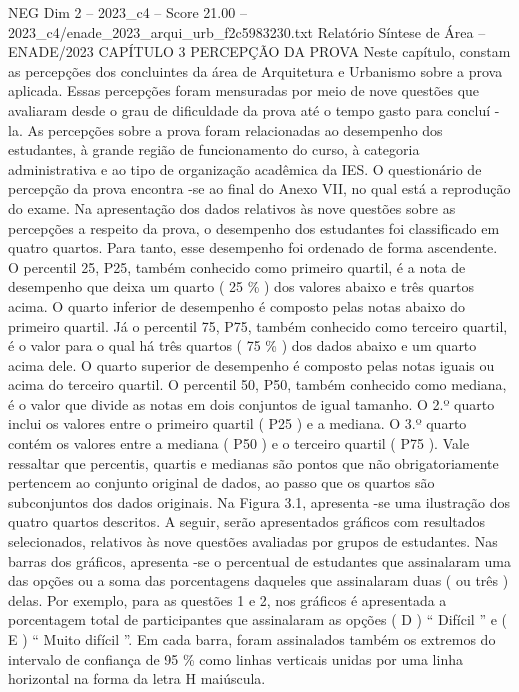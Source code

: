 \begin{textsample}{NEG Dim 2 – 2023\_c4 – Score 21.00 – 2023\_c4/enade\_2023\_arqui\_urb\_f2c5983230.txt}  \label{ex:f2_neg_416}
Relatório Síntese de Área – ENADE/2023 CAPÍTULO 3 PERCEPÇÃO DA PROVA Neste capítulo, constam as percepções dos concluintes da área de Arquitetura e Urbanismo sobre a prova aplicada.
Essas percepções foram mensuradas por meio de nove questões que avaliaram desde o grau de dificuldade da prova até o tempo gasto para concluí -la.
As percepções sobre a prova foram relacionadas ao desempenho dos estudantes, à grande região de funcionamento do curso, à categoria administrativa e ao tipo de organização acadêmica da IES.
O questionário de percepção da prova encontra -se ao final do Anexo VII, no qual está a reprodução do exame.
Na apresentação dos dados relativos às nove questões sobre as percepções a respeito da prova, o desempenho dos estudantes foi classificado em quatro quartos.
Para tanto, esse desempenho foi ordenado de forma ascendente.
O percentil 25, P25, também conhecido como primeiro quartil, é a nota de desempenho que deixa um quarto ( 25 \% ) dos valores abaixo e três quartos acima.
O quarto inferior de desempenho é composto pelas notas abaixo do primeiro quartil.
Já o percentil 75, P75, também conhecido como terceiro quartil, é o valor para o qual há três quartos ( 75 \% ) dos dados abaixo e um quarto acima dele.
O quarto superior de desempenho é composto pelas notas iguais ou acima do terceiro quartil.
O percentil 50, P50, também conhecido como mediana, é o valor que divide as notas em dois conjuntos de igual tamanho.
O 2.º quarto inclui os valores entre o primeiro quartil ( P25 ) e a mediana.
O 3.º quarto contém os valores entre a mediana ( P50 ) e o terceiro quartil ( P75 ).
Vale ressaltar que percentis, quartis e medianas são pontos que não obrigatoriamente pertencem ao conjunto original de dados, ao passo que os quartos são subconjuntos dos dados originais.
Na Figura 3.1, apresenta -se uma ilustração dos quatro quartos descritos.
A seguir, serão apresentados gráficos com resultados selecionados, relativos às nove questões avaliadas por grupos de estudantes.
Nas barras dos gráficos, apresenta -se o percentual de estudantes que assinalaram uma das opções ou a soma das porcentagens daqueles que assinalaram duas ( ou três ) delas.
Por exemplo, para as questões 1 e 2, nos gráficos é apresentada a porcentagem total de participantes que assinalaram as opções ( D ) “ Difícil ” e ( E ) “ Muito difícil ”.
Em cada barra, foram assinalados também os extremos do intervalo de confiança de 95 \% como linhas verticais unidas por uma linha horizontal na forma da letra H maiúscula.

\end{textsample}

